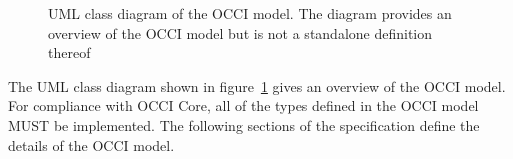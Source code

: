 \documentclass[10pt,a4paper,british]{article}
\begin{document}
\begin{figure}[!h]
{\centering {} \par}
\caption{UML class diagram of the OCCI model. The diagram provides an
overview of the OCCI model but is not a standalone definition thereof}
\label{fig:occi_model}
\end{figure}

The UML class diagram shown in figure~\ref{fig:occi_model} gives an overview of
the OCCI model.  For compliance with OCCI Core, all of the types defined in
the OCCI model MUST be implemented.
The following sections of the specification define the details of the OCCI
model.
\end{document}
